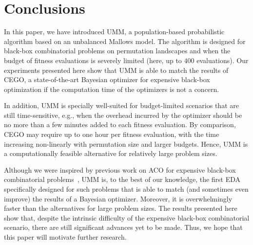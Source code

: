 \documentclass[runningheads]{llncs}
\begin{document}
\section{Conclusions}\label{sec:conclusions}

In this paper, we have introduced UMM, a population-based probabilistic
algorithm based on an unbalanced Mallows model. The algorithm is designed for
black-box combinatorial problems on permutation landscapes and when the budget
of fitness evaluations is severely limited (here, up to $400$ evaluations).
Our experiments presented here show that UMM is able to match the results of
CEGO, a state-of-the-art Bayesian optimizer for expensive black-box
optimization if the computation time of the optimizers is not a concern.

In addition, UMM is specially well-suited for budget-limited scenarios that are
still time-sensitive, e.g., when the overhead incurred by the optimizer should
be no more than a few minutes added to each fitness evaluation. By comparison,
CEGO may require up to one hour per fitness evaluation, with the time
increasing non-linearly with permutation size and larger budgets.  Hence, UMM
is a computationally feasible alternative for relatively large problem sizes.



Although we were inspired by previous work on ACO for expensive black-box
combinatorial problems~\citep{PerLopStu2015si}, UMM is, to the best of our
knowledge, the first EDA specifically designed for such problems that is able
to match (and sometimes even improve) the results of a Bayesian
optimizer. Moreover, it is overwhelmingly faster than the alternatives for
large problem sizes.  The results presented here show that, despite the
intrinsic difficulty of the expensive black-box combinatorial scenario, there
are still significant advances yet to be made. Thus, we hope that this paper
will motivate further research. %
\end{document}

